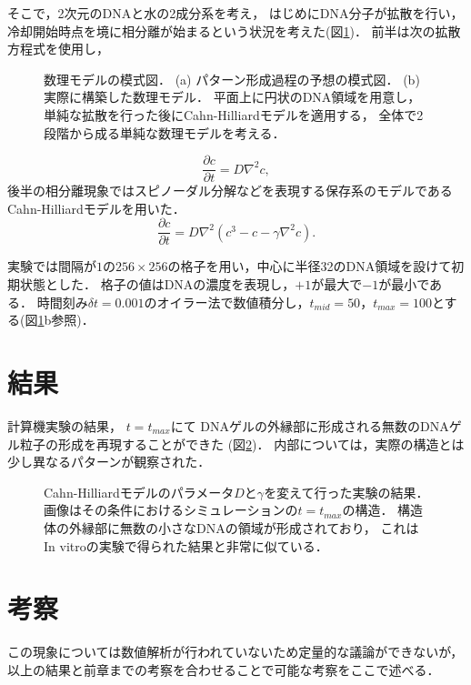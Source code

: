 そこで，2次元のDNAと水の2成分系を考え，
はじめにDNA分子が拡散を行い，
冷却開始時点を境に相分離が始まるという状況を考えた(図\ref{fig:model_cahn_hilliard})．
前半は次の拡散方程式を使用し，
\begin{figure}
    \centering
    
    \caption{
        数理モデルの模式図．
        (a) パターン形成過程の予想の模式図．
        (b) 実際に構築した数理モデル．
            平面上に円状のDNA領域を用意し，
            単純な拡散を行った後にCahn-Hilliardモデルを適用する，
            全体で2段階から成る単純な数理モデルを考える．
    }
    \label{fig:model_cahn_hilliard}
\end{figure}
\begin{equation}
    \frac{\partial c}{\partial t}
    =
    D \nabla^{2} c
    ,
\end{equation}
後半の相分離現象ではスピノーダル分解などを表現する保存系のモデルであるCahn-Hilliardモデルを用いた．
\begin{equation}
    \frac{\partial c}{\partial t}
    =
    D \nabla^{2} \left( c^3 - c - \gamma \nabla^{2} c \right)
    .
\end{equation}

実験では間隔が$1$の$256\times 256$の格子を用い，中心に半径32のDNA領域を設けて初期状態とした．
格子の値はDNAの濃度を表現し，$+1$が最大で$-1$が最小である．
時間刻み$\delta t=0.001$のオイラー法で数値積分し，$t_{mid}=50$，$t_{max}=100$とする(図\ref{fig:model_cahn_hilliard}b参照)．


\section{結果}
計算機実験の結果，
$t=t_{max}$にて
DNAゲルの外縁部に形成される無数のDNAゲル粒子の形成を再現することができた
(図\ref{fig:result_cahn_hilliard})．
内部については，実際の構造とは少し異なるパターンが観察された．
\begin{figure}
    \centering
    
    \caption{
        Cahn-Hilliardモデルのパラメータ$D$と$\gamma$を変えて行った実験の結果．
        画像はその条件におけるシミュレーションの$t=t_{max}$の構造．
        構造体の外縁部に無数の小さなDNAの領域が形成されており，
        これはIn vitroの実験で得られた結果と非常に似ている．
    }
    \label{fig:result_cahn_hilliard}
\end{figure}


\section{考察}
この現象については数値解析が行われていないため定量的な議論ができないが，
以上の結果と前章までの考察を合わせることで可能な考察をここで述べる．


